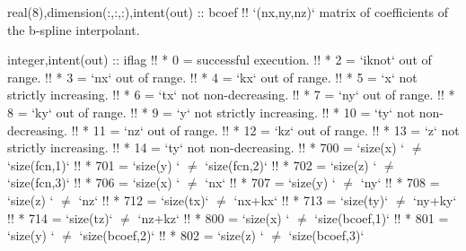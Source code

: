 \begin{fortrancode}
  real(8),dimension(:,:,:),intent(out) :: bcoef
  !! `(nx,ny,nz)` matrix of coefficients of the b-spline interpolant.

  integer,intent(out) :: iflag
  !! *  0 = successful execution.
  !! *  2 = `iknot` out of range.
  !! *  3 = `nx` out of range.
  !! *  4 = `kx` out of range.
  !! *  5 = `x` not strictly increasing.
  !! *  6 = `tx` not non-decreasing.
  !! *  7 = `ny` out of range.
  !! *  8 = `ky` out of range.
  !! *  9 = `y` not strictly increasing.
  !! * 10 = `ty` not non-decreasing.
  !! * 11 = `nz` out of range.
  !! * 12 = `kz` out of range.
  !! * 13 = `z` not strictly increasing.
  !! * 14 = `ty` not non-decreasing.
  !! * 700 = `size(x) ` $\ne$ `size(fcn,1)`
  !! * 701 = `size(y) ` $\ne$ `size(fcn,2)`
  !! * 702 = `size(z) ` $\ne$ `size(fcn,3)`
  !! * 706 = `size(x) ` $\ne$ `nx`
  !! * 707 = `size(y) ` $\ne$ `ny`
  !! * 708 = `size(z) ` $\ne$ `nz`
  !! * 712 = `size(tx)` $\ne$ `nx+kx`
  !! * 713 = `size(ty)` $\ne$ `ny+ky`
  !! * 714 = `size(tz)` $\ne$ `nz+kz`
  !! * 800 = `size(x) ` $\ne$ `size(bcoef,1)`
  !! * 801 = `size(y) ` $\ne$ `size(bcoef,2)`
  !! * 802 = `size(z) ` $\ne$ `size(bcoef,3)`
\end{fortrancode}
